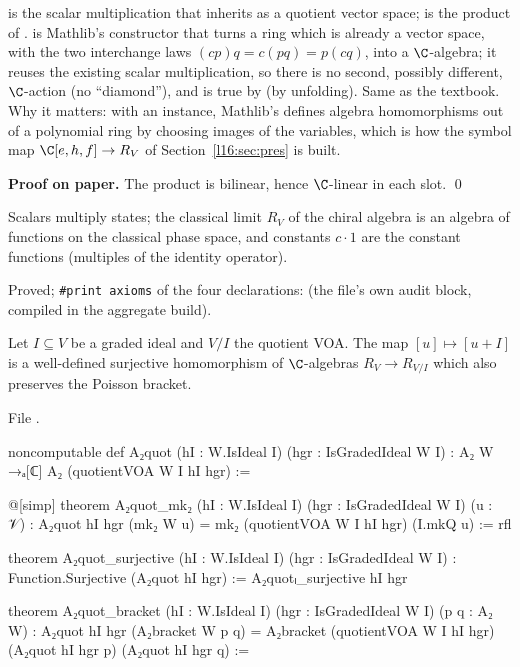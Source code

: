 \begin{dictionary}
 is the scalar multiplication that  inherits as a quotient vector space;  is the
product of .  is Mathlib's constructor that turns a ring which is
already a vector space, with the two interchange laws $(cp)q = c(pq) = p(cq)$, into a $\C$-algebra; it reuses
the existing scalar multiplication, so there is no second, possibly different, $\C$-action (no ``diamond''),
and  is true by  (by unfolding). Same as the textbook. Why it matters:
with an  instance, Mathlib's  defines algebra homomorphisms out of a
polynomial ring by choosing images of the variables, which is how the symbol map
$\C[e,h,f]\to R_V$ of Section~\ref{l16:sec:pres} is built.
\end{dictionary}

\textbf{Proof on paper.} The product is bilinear, hence $\C$-linear in each slot. \qed

\begin{physics}
Scalars multiply states; the classical limit $R_V$ of the chiral algebra is an algebra of functions on the
classical phase space, and constants $c\cdot 1$ are the constant functions (multiples of the identity
operator).
\end{physics}

\begin{status}
Proved; \texttt{\#print axioms} of the four declarations: \lean{[propext, Classical.}\allowbreak{}\allowbreak\lean{sound]} (the
file's own audit block, compiled in the aggregate build).
\end{status}

\begin{theorem}\label{l16:thm:quot}
Let $I\subseteq V$ be a graded ideal and $V/I$ the quotient VOA. The map $[u]\mapsto[u+I]$ is a well-defined
surjective homomorphism of $\C$-algebras $R_V\to R_{V/I}$ which also preserves the Poisson bracket.
\end{theorem}
\noindent File .
\begin{leancode}
noncomputable def A₂quot (hI : W.IsIdeal I) (hgr : IsGradedIdeal W I) :
    A₂ W →ₐ[ℂ] A₂ (quotientVOA W I hI hgr) :=

@[simp] theorem A₂quot_mk₂ (hI : W.IsIdeal I) (hgr : IsGradedIdeal W I) (u : 𝒱) :
    A₂quot hI hgr (mk₂ W u) = mk₂ (quotientVOA W I hI hgr) (I.mkQ u) := rfl

theorem A₂quot_surjective (hI : W.IsIdeal I) (hgr : IsGradedIdeal W I) :
    Function.Surjective (A₂quot hI hgr) := A₂quotₗ_surjective hI hgr

theorem A₂quot_bracket (hI : W.IsIdeal I) (hgr : IsGradedIdeal W I) (p q : A₂ W) :
    A₂quot hI hgr (A₂bracket W p q)
      = A₂bracket (quotientVOA W I hI hgr) (A₂quot hI hgr p) (A₂quot hI hgr q) :=
\end{leancode}

